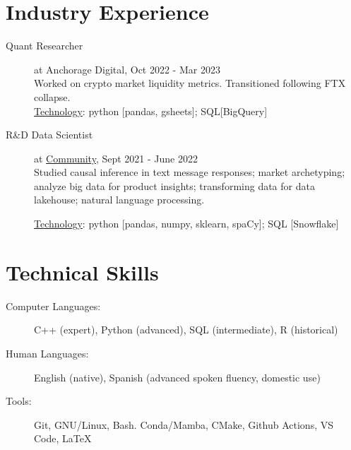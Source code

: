 \documentclass[11pt]{article}
\begin{document}

\section*{Industry Experience}
\begin{minipage}{\textwidth}
	\begin{description}
		\item[Quant Researcher] at Anchorage Digital, Oct 2022 - Mar 2023\\
			Worked on crypto market liquidity metrics.  Transitioned following FTX collapse.\\
			\underline{Technology}: python [pandas, gsheets]; SQL[BigQuery]
		\item[R\&D Data Scientist] at \href{https://www.community.com/about-us}{Community}, Sept 2021 - June 2022\\
			Studied causal inference in text message responses; market archetyping; analyze big data for product insights; transforming data for data lakehouse; natural language processing.\\
			\rule{0pt}{12pt}\underline{Technology}: python [pandas, numpy, sklearn, spaCy]; SQL [Snowflake]
	\end{description}
\end{minipage}

\section*{Technical Skills}
\begin{minipage}{\columnwidth}
	\begin{description}
		\item[Computer Languages:] C++ (expert), Python (advanced), SQL (intermediate), R (historical)
		\item[Human Languages:] English (native), Spanish (advanced spoken fluency, domestic use)
		\item[Tools:] Git, GNU/Linux, Bash. Conda/Mamba, CMake, Github Actions, VS Code, \LaTeX
	\end{description}
\end{minipage}
\end{document}
